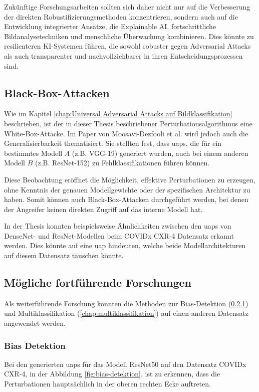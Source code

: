 Zukünftige Forschungsarbeiten sollten sich daher nicht nur auf die Verbesserung der direkten Robustifizierungsmethoden konzentrieren, sondern auch auf die Entwicklung integrierter Ansätze, die Explainable AI, fortschrittliche Bildanalysetechniken und menschliche Überwachung kombinieren. Dies könnte zu resilienteren KI-Systemen führen, die sowohl robuster gegen Adversarial Attacks als auch transparenter und nachvollziehbarer in ihren Entscheidungsprozessen sind.

\subsection{Black-Box-Attacken}
Wie im Kapitel \ref{chap:Universal Adversarial Attacks auf Bildklassifikation} beschrieben, ist der in dieser Thesis beschriebener Perturbationsalgorithmus eine White-Box-Attacke. Im Paper von Moosavi-Dezfooli et al. \cite{moosavi-dezfooli_universal_2017} wird jedoch auch die Generalisierbarkeit thematisiert. Sie stellten fest, dass \acrshort{uap}s, die für ein bestimmtes Modell $A$ (z.B. VGG-19) generiert wurden, auch bei einem anderen Modell $B$ (z.B. ResNet-152) zu Fehlklassifikationen führen können.

Diese Beobachtung eröffnet die Möglichkeit, effektive Perturbationen zu erzeugen, ohne Kenntnis der genauen Modellgewichte oder der spezifischen Architektur zu haben. Somit können auch Black-Box-Attacken durchgeführt werden, bei denen der Angreifer keinen direkten Zugriff auf das interne Modell hat. 

\newpage

In der Thesis konnten beispielsweise Ähnlichkeiten zwischen den \acrshort{uap}s von DenseNet- und ResNet-Modellen beim COVIDx CXR-4 Datensatz erkannt werden. Dies könnte auf eine \acrshort{uap} hindeuten, welche beide Modellarchitekturen auf diesem Datensatz täuschen könnte.

\subsection{Mögliche fortführende Forschungen}
Als weiterführende Forschung könnten die Methoden zur Bias-Detektion (\ref{chap:bias-detektion}) und Multiklassifikation (\ref{chap:multiklassifikation}) auf einen anderen Datensatz angewendet werden.

\subsubsection{Bias Detektion} \label{chap:bias-detektion}
Bei den generierten \acrlong{uap}s für das Modell ResNet50 auf den Datensatz COVIDx CXR-4, in der Abbildung \ref{fig:bias-detektion}, ist zu erkennen, dass die Perturbationen hauptsächlich in der oberen rechten Ecke auftreten.

